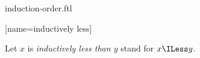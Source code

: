 \documentclass{stex}
\begin{document}
\begin{smodule}{induction-order.ftl}

[name=inductively less]{\mathrel{\comp\prec}}


\begin{forthel}
  \begin{convention}
    Let $x$ is \emph{inductively less than $y$} stand for $x \ILess y$.
  \end{convention}
\end{forthel}

\end{smodule}
\end{document}
